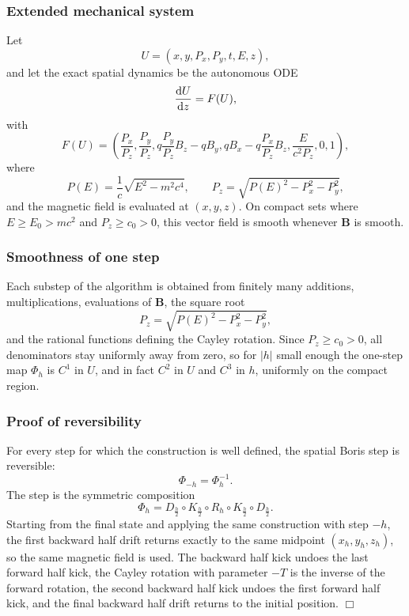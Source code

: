\subsubsection{Extended mechanical system}
Let
\[
U=(x,y,P_x,P_y,t,E,z),
\]
and let the exact spatial dynamics be the autonomous ODE
\[
\frac{\text{d} {U}}{\text{d} {z}}=F(U),
\]
with
\[
F(U)=\left(
\frac{P_x}{P_z},
\frac{P_y}{P_z},
q\frac{P_y}{P_z}B_z-qB_y,
qB_x-q\frac{P_x}{P_z}B_z,
\frac{E}{c^2P_z},
0,
1
\right),
\]
where
\[
P(E)=\frac{1}{c}\sqrt{E^2-m^2c^4},
\qquad
P_z=\sqrt{P(E)^2-P_x^2-P_y^2},
\]
and the magnetic field is evaluated at \((x,y,z)\).
On compact sets where \(E\ge E_0>mc^2\) and \(P_z\ge c_0>0\), this vector
field is smooth whenever \(\bm B\) is smooth.

\subsubsection{Smoothness of one step}
Each substep of the algorithm is obtained from finitely many additions,
multiplications, evaluations of \(\bm B\), the square root
\[
P_z=\sqrt{P(E)^2-P_x^2-P_y^2},
\]
and the rational functions defining the Cayley rotation.
Since \(P_z\ge c_0>0\), all denominators stay uniformly away from zero, so for
\(|h|\) small enough the one-step map \(\Phi_h\) is \(C^1\) in \(U\), and in
fact \(C^2\) in \(U\) and \(C^3\) in \(h\), uniformly on the compact region.

\subsubsection{Proof of reversibility}
For every step for which the construction is well defined, the spatial Boris
step is reversible:
\begin{equation}
\Phi_{-h}=\Phi_h^{-1}.
\label{boris:eq:reversibility}
\end{equation}
The step is the symmetric composition
\[
\Phi_h = D_{\frac h2}\circ K_{\frac h2}\circ R_h\circ K_{\frac h2}\circ D_{\frac h2}.
\]
Starting from the final state and applying the same construction with step
\(-h\), the first backward half drift returns exactly to the same midpoint
\((x_h,y_h,z_h)\), so the same magnetic field is used.
The backward half kick undoes the last forward half kick, the Cayley rotation
with parameter \(-T\) is the inverse of the forward rotation, the second
backward half kick undoes the first forward half kick, and the final backward
half drift returns to the initial position. \hfill\(\Box\)

